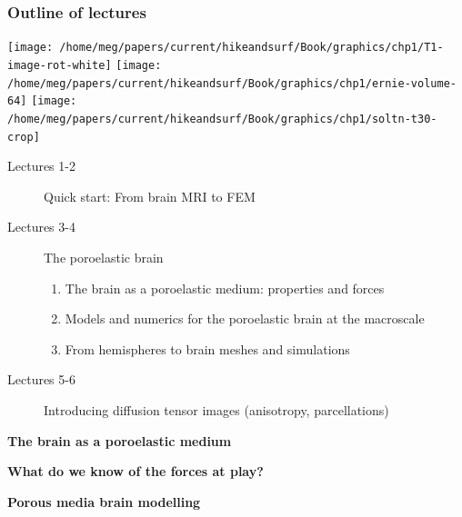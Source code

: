 \documentclass[10pt, mathserif, aspectratio=169, t]{beamer}
\newcommand{\mysection}[1]{\begin{frame} \begin{center} \vspace{3em} \textbf{#1} \end{center} \end{frame}}
\begin{document}
\begin{frame}
  \frametitle{Outline of lectures}
  \begin{center}
  \texttt{[image: /home/meg/papers/current/hikeandsurf/Book/graphics/chp1/T1-image-rot-white]}
  \texttt{[image: /home/meg/papers/current/hikeandsurf/Book/graphics/chp1/ernie-volume-64]}
  \texttt{[image: /home/meg/papers/current/hikeandsurf/Book/graphics/chp1/soltn-t30-crop]}
  \end{center}
  \begin{description}
    \item[Lectures 1-2] Quick start: From brain MRI to FEM
    \item[Lectures 3-4] The poroelastic brain  
      \begin{enumerate}[I]
      \item
        The brain as a poroelastic medium: properties and forces
      \item
        Models and numerics for the poroelastic brain at the macroscale
      \item
        From hemispheres to brain meshes and simulations
      \end{enumerate}
    \item[Lectures 5-6] Introducing diffusion tensor images (anisotropy, parcellations)
  \end{description}
\end{frame}

\graphicspath{{/home/meg/presentations/slidesx/}}

\mysection{The brain as a poroelastic medium}







\mysection{What do we know of the forces at play?}




\mysection{Porous media brain modelling}




\end{document}

